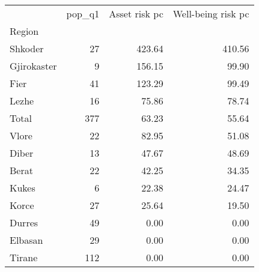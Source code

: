 \begin{tabular}{lrrr}
\toprule
{} &  pop\_q1 &  Asset risk pc &  Well-being risk pc \\
Region      &         &                &                     \\
\midrule
Shkoder     &      27 &         423.64 &              410.56 \\
Gjirokaster &       9 &         156.15 &               99.90 \\
Fier        &      41 &         123.29 &               99.49 \\
Lezhe       &      16 &          75.86 &               78.74 \\
Total       &     377 &          63.23 &               55.64 \\
Vlore       &      22 &          82.95 &               51.08 \\
Diber       &      13 &          47.67 &               48.69 \\
Berat       &      22 &          42.25 &               34.35 \\
Kukes       &       6 &          22.38 &               24.47 \\
Korce       &      27 &          25.64 &               19.50 \\
Durres      &      49 &           0.00 &                0.00 \\
Elbasan     &      29 &           0.00 &                0.00 \\
Tirane      &     112 &           0.00 &                0.00 \\
\bottomrule
\end{tabular}
